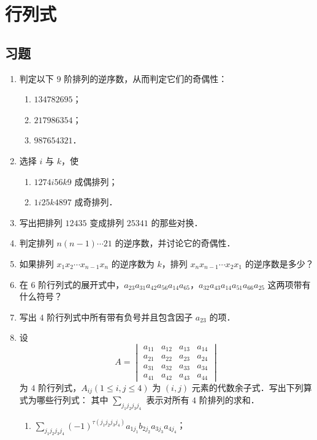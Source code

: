 \chapter{行列式}
\section{习题}
\begin{enumerate}
  \item 判定以下 $9$ 阶排列的逆序数，从而判定它们的奇偶性：
  \begin{enumerate}
    \item $134782695$；
  \anssub
    \item $217986354$；
  \anssub
    \item $987654321$．
  \anssub
  \end{enumerate}
  \item 选择 $i$ 与 $k$，使
  \begin{enumerate}
    \item $1274i56k9$ 成偶排列；
  \anssub
    \item $1i25k4897$ 成奇排列．
  \anssub
  \end{enumerate}
  \item 写出把排列 $12435$ 变成排列 $25341$ 的那些对换．
  \anscompute
  \item 判定排列 $n(n-1)\cdots21$ 的逆序数，并讨论它的奇偶性．
  \anscompute
  \item 如果排列 $x_1x_2\cdots x_{n-1}x_n$ 的逆序数为 $k$，排列 $x_nx_{n-1}\cdots x_2x_1$ 的逆序数是多少？
  \ansgeneral
  \item 在 $6$ 阶行列式的展开式中，$a_{23}a_{31}a_{42}a_{56}a_{14}a_{65}$，$a_{32}a_{43}a_{14}a_{51}a_{66}a_{25}$ 这两项带有什么符号？
  \ansgeneral
  \item 写出 $4$ 阶行列式中所有带有负号并且包含因子 $a_{23}$ 的项．
  \anscompute
  \item 设
  \[
    A=
    \begin{vmatrix}
      a_{11}&a_{12}&a_{13}&a_{14}\\
      a_{21}&a_{22}&a_{23}&a_{24}\\
      a_{31}&a_{32}&a_{33}&a_{34}\\
      a_{41}&a_{42}&a_{43}&a_{44}
    \end{vmatrix}
  \]
  为 $4$ 阶行列式，$A_{ij}(1\leq i,j\leq 4)$ 为 $(i,j)$ 元素的代数余子式．写出下列算式为哪些行列式：
  其中 $\displaystyle\sum_{j_1j_2j_3j_4}$ 表示对所有 $4$ 阶排列的求和．
  \begin{enumerate}
    \item $\displaystyle\sum_{j_1j_2j_3j_4}(-1)^{\tau(j_1j_2j_3j_4)}a_{1j_1}b_{2j_2}a_{3j_3}a_{4j_4}$；%

\end{enumerate}
\end{enumerate}
